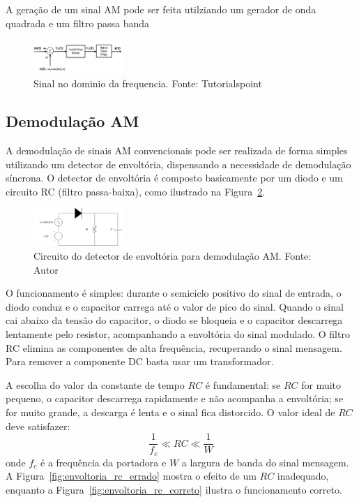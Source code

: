 A geração de um sinal AM pode ser feita utilziando um gerador de onda quadrada e um filtro passa banda

\begin{figure}[h]
\centering
\includegraphics[width=0.3\textwidth]{images/blocos_amd_con.png}
\caption{Sinal no dominio da frequencia. Fonte: Tutorialspoint} 
\label{fig:diagrama_blocos_am_convencional}
\end{figure}

\subsection{Demodulação AM}

A demodulação de sinais AM convencionais pode ser realizada de forma simples utilizando um detector de envoltória, dispensando a necessidade de demodulação síncrona. O detector de envoltória é composto basicamente por um diodo e um circuito RC (filtro passa-baixa), como ilustrado na Figura~\ref{fig:circuito_demodulador_am}.

\begin{figure}[h]
\centering
\includegraphics[width=0.3\textwidth]{images/demodulacao_am_circuito.png}
\caption{Circuito do detector de envoltória para demodulação AM. Fonte: Autor} 
\label{fig:circuito_demodulador_am}
\end{figure}

O funcionamento é simples: durante o semiciclo positivo do sinal de entrada, o diodo conduz e o capacitor carrega até o valor de pico do sinal. Quando o sinal cai abaixo da tensão do capacitor, o diodo se bloqueia e o capacitor descarrega lentamente pelo resistor, acompanhando a envoltória do sinal modulado. O filtro RC elimina as componentes de alta frequência, recuperando o sinal mensagem. Para remover a componente DC basta usar um transformador.

A escolha do valor da constante de tempo $RC$ é fundamental: se $RC$ for muito pequeno, o capacitor descarrega rapidamente e não acompanha a envoltória; se for muito grande, a descarga é lenta e o sinal fica distorcido. O valor ideal de $RC$ deve satisfazer:
\[
\frac{1}{f_c} \ll RC \ll \frac{1}{W}
\]
onde $f_c$ é a frequência da portadora e $W$ a largura de banda do sinal mensagem. A Figura~\ref{fig:envoltoria_rc_errado} mostra o efeito de um $RC$ inadequado, enquanto a Figura~\ref{fig:envoltoria_rc_correto} ilustra o funcionamento correto.

